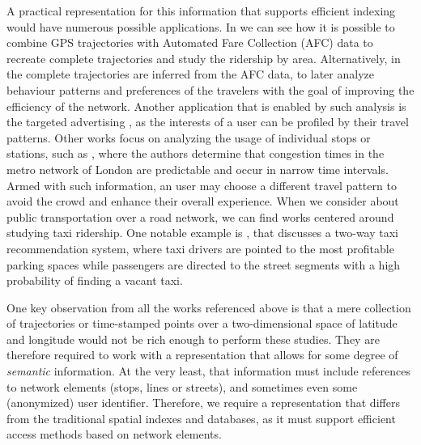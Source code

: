\documentclass{UniVieCS_PhD} %
\begin{document}
	A practical representation for this information that supports efficient indexing would have numerous possible applications. In \cite{tu2018spatial} we can see how it is possible to combine GPS trajectories with Automated Fare Collection (AFC) data to recreate complete trajectories and study the ridership by area. Alternatively, in \cite{weng2018mining} the complete trajectories are inferred from the AFC data, to later analyze behaviour patterns and preferences of the travelers with the goal of improving the efficiency of the network. Another application that is enabled by such analysis is the targeted advertising \cite{zhang2017targeted}, as the interests of a user can be profiled by their travel patterns. Other works focus on analyzing the usage of individual stops or stations, such as \cite{ceapa2012avoiding}, where the authors determine that congestion times in the metro network of London are predictable and occur in narrow time intervals. Armed with such information, an user may choose a different travel pattern to avoid the crowd and enhance their overall experience. When we consider about public transportation over a road network, we can find works centered around studying taxi ridership. One notable example is \cite{yuan2013t}, that discusses a two-way taxi recommendation system, where taxi drivers are pointed to the most profitable parking spaces while passengers are directed to the street segments with a high probability of finding a vacant taxi.
	
	One key observation from all the works referenced above is that a mere collection of trajectories or time-stamped points over a two-dimensional space of latitude and longitude would not be rich enough to perform these studies. They are therefore required to work with a representation that allows for some degree of \textit{semantic} information. At the very least, that information must include references to network elements (stops, lines or streets), and sometimes even some (anonymized) user identifier. Therefore, we require a representation that differs from the traditional spatial indexes and databases, as it must support efficient access methods based on network elements.
	
\end{document}

